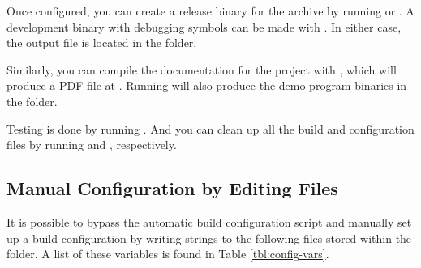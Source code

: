 Once configured, you can create a release binary for the archive by running  or . A development binary with debugging symbols can be made with . In either case, the output file is located in the  folder.

Similarly, you can compile the documentation for the project with , which will produce a PDF file at . Running  will also produce the demo program binaries in the  folder.

Testing is done by running . And you can clean up all the build and configuration files by running  and , respectively.

\subsection{Manual Configuration by Editing Files}

It is possible to bypass the automatic build configuration script and manually set up a build configuration by writing strings to the following files stored within the  folder. A list of these variables is found in Table \ref{tbl:config-vars}.

